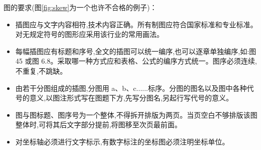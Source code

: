 ﻿\documentclass{sysuthesis}
\begin{document}
图的要求(图\ref{fig:skew}为一个也许不合格的例子)：

\begin{itemize}
	\item 插图应与文字内容相符,技术内容正确。所有制图应符合国家标准和专业标准。对无规定符号的图形应采用该行业的常用画法。
	\item 每幅插图应有标题和序号,全文的插图可以统一编序,也可以逐章单独编序,如:图 45 或图 6.8。采取哪一种方式应和表格、公式的编序方式统一。图序必须连续,不重复,不跳缺。
	\item 由若干分图组成的插图,分图用 a、b、c......标序。分图的图名以及图中各种代号的意义,以图注形式写在图题下方,先写分图名,另起行写代号的意义。
	\item 图与图标题、图序号为一个整体,不得拆开排版为两页。当页空白不够排版该图整体时,可将其后文字部分提前,将图移至次页最前面。
	\item 对坐标轴必须进行文字标示,有数字标注的坐标图必须注明坐标单位。
\end{itemize}
\end{document}
